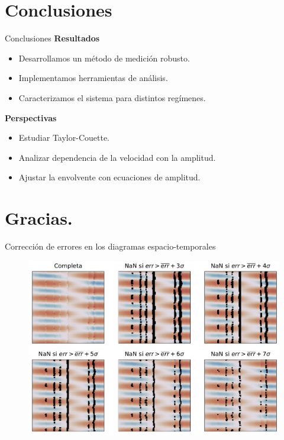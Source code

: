 \documentclass[aspectratio=169]{beamer}
\begin{document}
\section{Conclusiones}
\begin{frame}{Conclusiones}
	\textbf{Resultados}
	\begin{itemize} 
		\item Desarrollamos un método de medición robusto.
		\item Implementamos herramientas de análisis.
		\item Caracterizamos el sistema para distintos regímenes.
	\end{itemize}

	\hfill

	\textbf{Perspectivas}
	\begin{itemize} 
		\item Estudiar Taylor-Couette.
		\item Analizar dependencia de la velocidad con la amplitud.
		\item Ajustar la envolvente con ecuaciones de amplitud.
	\end{itemize}
\end{frame}

\section*{Gracias.}

\begin{frame}{Corrección de errores en los diagramas espacio-temporales}
	\begin{figure}
		\includegraphics[width=0.75\linewidth]{figs/error_analysis.pdf}
	\end{figure}
\end{frame}
\end{document}

